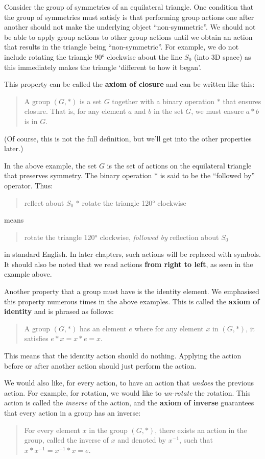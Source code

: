 Consider the group of symmetries of an equilateral triangle. One condition that the group of symmetries must satisfy is that performing group actions one after another should not make the underlying object ``non-symmetric''. We should not be able to apply group actions to other group actions until we obtain an action that results in the triangle being ``non-symmetric''. For example, we do not include rotating the triangle 90° clockwise about the line $S_0$ (into 3D space) as this immediately makes the triangle `different to how it began'.

This property can be called the \textbf{axiom of closure} and can be written like this:
\begin{quote}
    A group $(G, \ast)$ is a set $G$ together with a binary operation $\ast$ that ensures closure. That is, for any element $a$ and $b$ in the set $G$, we must ensure $a \ast b$ is in $G$.
\end{quote}
(Of course, this is not the full definition, but we'll get into the other properties later.)

In the above example, the set $G$ is the set of actions on the equilateral triangle that preserves symmetry. The binary operation $\ast$ is said to be the ``followed by'' operator. Thus:
\begin{quote}
    reflect about $S_0$ $\ast$ rotate the triangle 120° clockwise
\end{quote}
means
\begin{quote}
    rotate the triangle 120° clockwise, \textit{followed by} reflection about $S_0$
\end{quote}
in standard English. In later chapters, such actions will be replaced with symbols. It should also be noted that we read actions \textbf{from right to left}, as seen in the example above.

Another property that a group must have is the identity element. We emphasised this property numerous times in the above examples. This is called the \textbf{axiom of identity} and is phrased as follows:
\begin{quote}
    A group $(G, \ast)$ has an element $e$ where for any element $x$ in $(G, \ast)$, it satisfies $e \ast x = x \ast e = x$.
\end{quote}
This means that the identity action should do nothing. Applying the action before or after another action should just perform the action.

We would also like, for every action, to have an action that \textit{undoes} the previous action. For example, for rotation, we would like to \textit{un-rotate} the rotation. This action is called the \textit{inverse} of the action, and the \textbf{axiom of inverse} guarantees that every action in a group has an inverse:
\begin{quote}
    For every element $x$ in the group $(G, \ast)$, there exists an action in the group, called the inverse of $x$ and denoted by $x^{-1}$, such that $x \ast x^{-1} = x^{-1} \ast x = e$.
\end{quote}


